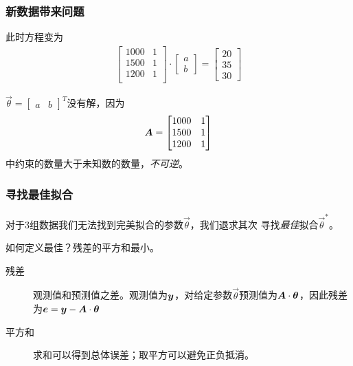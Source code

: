 \documentclass[14pt]{beamer}
\begin{document}
\begin{frame}
    \frametitle{新数据带来问题}
    \label{fr:three_zones}
    此时方程变为
    \begin{align*}
        \begin{bmatrix}
            1000 & 1\\
            1500 & 1\\
            1200 & 1\\
        \end{bmatrix}\cdot
        \begin{bmatrix}
            a \\
            b
        \end{bmatrix}=
        \begin{bmatrix}
            20\\
            35\\
            30
        \end{bmatrix}
    \end{align*}

    $\vec{\theta}=
    \begin{bmatrix}
        a & b
    \end{bmatrix}^T$没有解，因为
    \[
        \bm{A}=    
        \begin{bmatrix}
            1000 & 1\\
            1500 & 1\\
            1200 & 1\\
        \end{bmatrix}
        \]
    中约束的数量大于未知数的数量，\emph{不可逆}。
    \end{frame}

    \begin{frame}
        \frametitle{寻找最佳拟合}
        对于3组数据我们无法找到完美拟合的参数$\vec{\theta}$，我们退求其次
        寻找\emph{最佳}拟合$\vec{\theta}^*$。
        
        如何定义最佳？残差的平方和最小。
        \begin{description}
            \item[残差] 观测值和预测值之差。观测值为$\bm{y}$，对给定参数$\vec{\theta}$预测值为$\bm{A}\cdot\bm{\theta}$，因此残差为$\bm{e}=\bm{y}-\bm{A}\cdot\bm{\theta}$ 
            \item[平方和] 求和可以得到总体误差；取平方可以避免正负抵消。 
        \end{description}
    \end{frame}
\end{document}
